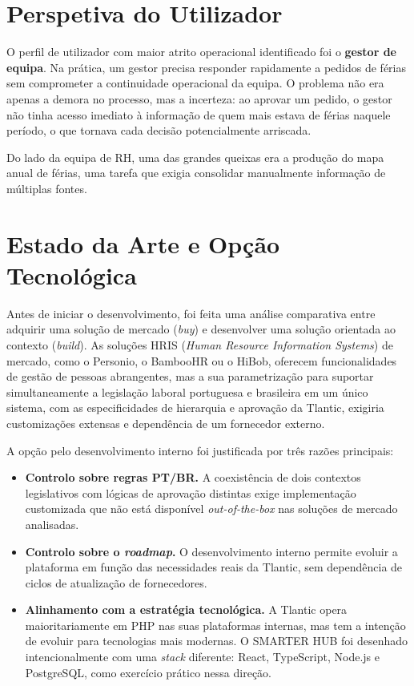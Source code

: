 \documentclass[12pt, a4paper, twoside, openright]{report}
\begin{document}
\section{Perspetiva do Utilizador}

O perfil de utilizador com maior atrito operacional identificado foi o \textbf{gestor de equipa}.
Na prática, um gestor precisa responder rapidamente a pedidos de férias sem comprometer
a continuidade operacional da equipa. O problema não era apenas a demora no processo,
mas a incerteza: ao aprovar um pedido, o gestor não tinha acesso imediato à informação
de quem mais estava de férias naquele período, o que tornava cada decisão potencialmente
arriscada.

Do lado da equipa de RH, uma das grandes queixas era a produção do mapa anual de férias, uma tarefa que exigia consolidar manualmente informação de múltiplas fontes.

\section{Estado da Arte e Opção Tecnológica}

Antes de iniciar o desenvolvimento, foi feita uma análise comparativa entre adquirir uma
solução de mercado (\textit{buy}) e desenvolver uma solução orientada ao contexto (\textit{build}).
As soluções HRIS (\textit{Human Resource Information Systems}) de mercado, como o Personio,
o BambooHR ou o HiBob, oferecem funcionalidades de gestão de pessoas abrangentes,
mas a sua parametrização para suportar simultaneamente a legislação laboral portuguesa
e brasileira em um único sistema, com as especificidades de hierarquia e aprovação da
Tlantic, exigiria customizações extensas e dependência de um fornecedor externo.

A opção pelo desenvolvimento interno foi justificada por três razões principais:

\begin{itemize}
  \item \textbf{Controlo sobre regras PT/BR.} A coexistência de dois contextos legislativos
        com lógicas de aprovação distintas exige implementação customizada que não
        está disponível \textit{out-of-the-box} nas soluções de mercado analisadas.
  \item \textbf{Controlo sobre o \textit{roadmap}.} O desenvolvimento interno permite evoluir
        a plataforma em função das necessidades reais da Tlantic, sem dependência de
        ciclos de atualização de fornecedores.
  \item \textbf{Alinhamento com a estratégia tecnológica.} A Tlantic opera maioritariamente
        em PHP nas suas plataformas internas, mas tem a intenção de evoluir para tecnologias
        mais modernas. O SMARTER HUB foi desenhado intencionalmente com uma
        \textit{stack} diferente: React, TypeScript, Node.js e PostgreSQL, como
        exercício prático nessa direção.
\end{itemize}
\end{document}
